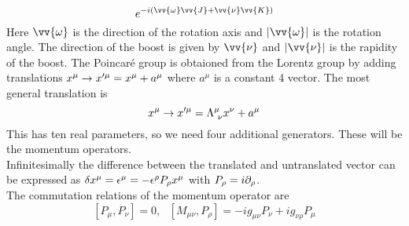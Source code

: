 \[ e^{-i(\vv{\omega}\vv{J} + \vv{\nu}\vv{K})}\]
Here $\vv{\omega}$ is the direction of the rotation axis and $|\vv{\omega}|$ is the rotation angle. The direction of the boost is given by $\vv{\nu}$ and $|\vv{\nu}|$ is the rapidity of the boost.\newline
{}
The Poincaré group is obtaioned from the Lorentz group by adding translations $x^\mu \rightarrow x'^\mu = x^\mu + a^\mu$ where $a^\mu$ is a constant 4 vector. The most general translation is
\[ x^\mu \rightarrow x'^\mu = \Lambda^\mu_{~\nu}x^\nu + a^\mu\]
This has ten real parameters, so we need four additional generators. These will be the momentum operators.\\
Infinitesimally the difference between the translated and untranslated vector can be expressed as $\delta x^\mu = \epsilon^\mu = - \epsilon^\rho P_\rho x^\mu$ with $P_\rho = i \partial_\rho$.\\
The commutation relations of the momentum operator are
\[ [P_\mu, P_\nu] = 0, ~~~[M_{\mu\nu}, P_\rho] = -i g_{\mu\nu}P_\nu + ig_{\nu\rho}P_\mu\]


